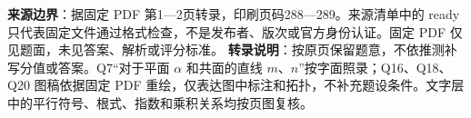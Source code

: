 

\begin{gktip}
\textbf{来源边界}：据固定 PDF 第1—2页转录，印刷页码288—289。来源清单中的 ready 只代表固定文件通过格式检查，不是发布者、版次或官方身份认证。固定 PDF 仅见题面，未见答案、解析或评分标准。
\textbf{转录说明}：按原页保留题意，不依推测补写分值或答案。Q7“对于平面 $\alpha$ 和共面的直线 $m$、$n$”按字面照录；Q16、Q18、Q20 图稿依据固定 PDF 重绘，仅表达图中标注和拓扑，不补充题设条件。文字层中的平行符号、根式、指数和乘积关系均按页图复核。
\end{gktip}


